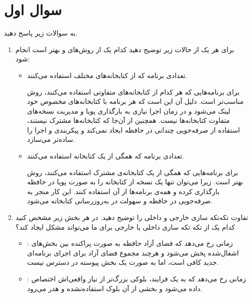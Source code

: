 \section{سوال اول}


به سوالات زیر پاسخ دهید.

\begin{enumerate}
	\item 
	برای هر یک از حالات زیر توضیح دهید کدام یک از روش‌های  و  بهتر است انجام شود:
	
	\begin{itemize}
		\item تعدادی برنامه که از کتابخانه‌های مختلف استفاده می‌کنند.
		
		\begin{qsolve}
	برای برنامه‌هایی که هر کدام از کتابخانه‌های متفاوتی استفاده می‌کنند، روش  مناسب‌تر است. دلیل آن این است که هر برنامه با کتابخانه‌های مخصوص خود لینک می‌شود و در زمان اجرا نیازی به بارگذاری پویا و مدیریت نسخه‌های متفاوت کتابخانه‌ها نیست. همچنین از آن‌جا که کتابخانه‌ها مشترک نیستند، استفاده از  صرفه‌جویی چندانی در حافظه ایجاد نمی‌کند و  پیکربندی و اجرا را ساده‌تر می‌سازد.
		\end{qsolve}
		
		
		\item تعدادی برنامه که همگی از یک کتابخانه استفاده می‌کنند.
		\begin{qsolve}
	برای برنامه‌هایی که همگی از یک کتابخانه‌ی مشترک استفاده می‌کنند، روش  بهتر است. زیرا می‌توان تنها یک نسخه از کتابخانه را به صورت پویا در حافظه بارگذاری کرده و همه‌ی برنامه‌ها از آن استفاده کنند. این کار منجر به صرفه‌جویی در حافظه و سهولت در به‌روزرسانی کتابخانه می‌شود.
		\end{qsolve}
	\end{itemize}
	
	
	
	\item 
	تفاوت تکه‌تکه سازی خارجی و داخلی را توضیح دهید. در هر بخش زیر مشخص کنید کدام یک از تکه تکه سازی داخلی یا خارجی برای ما می‌تواند مشکل ایجاد کند؟
	\begin{qsolve}
		\begin{itemize}
			\item {}: زمانی رخ می‌دهد که فضای آزاد حافظه به صورت پراکنده بین بخش‌های اشغال‌شده پخش می‌شود و هرچند مجموع فضای آزاد برای اجرای برنامه‌ای جدید کافی است، اما به صورت یک بخش پیوسته در دسترس نیست.
			\item {}: زمانی رخ می‌دهد که به یک فرایند، بلوکی بزرگ‌تر از نیاز واقعی‌اش اختصاص داده می‌شود و بخشی از آن بلوک استفاده‌نشده و هدر می‌رود.
		\end{itemize}
	\end{qsolve}
	

\end{enumerate}
